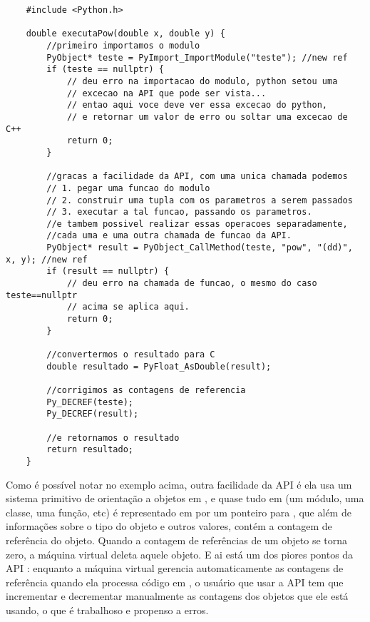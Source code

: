     \begin{lstlisting}
    #include <Python.h>
    
    double executaPow(double x, double y) {
        //primeiro importamos o modulo
        PyObject* teste = PyImport_ImportModule("teste"); //new ref
        if (teste == nullptr) {
            // deu erro na importacao do modulo, python setou uma 
            // excecao na API que pode ser vista...
            // entao aqui voce deve ver essa excecao do python,
            // e retornar um valor de erro ou soltar uma excecao de C++
            return 0;
        }
        
        //gracas a facilidade da API, com uma unica chamada podemos
        // 1. pegar uma funcao do modulo
        // 2. construir uma tupla com os parametros a serem passados
        // 3. executar a tal funcao, passando os parametros.
        //e tambem possivel realizar essas operacoes separadamente,
        //cada uma e uma outra chamada de funcao da API.
        PyObject* result = PyObject_CallMethod(teste, "pow", "(dd)", x, y); //new ref
        if (result == nullptr) {
            // deu erro na chamada de funcao, o mesmo do caso teste==nullptr
            // acima se aplica aqui.
            return 0;
        }
        
        //convertermos o resultado para C
        double resultado = PyFloat_AsDouble(result);
        
        //corrigimos as contagens de referencia
        Py_DECREF(teste);
        Py_DECREF(result);
        
        //e retornamos o resultado
        return resultado;
    }
    \end{lstlisting}
      
    \vspace{1em}
    
    Como é possível notar no exemplo acima, outra facilidade da API é ela usa um sistema 
    primitivo de orientação a objetos em \C{}, e quase tudo em  (um módulo, uma 
    classe, uma função, etc) é representado em \C{} por um ponteiro para , 
    que além de informações sobre o tipo do objeto e outros valores, contém a contagem de 
    referência do objeto. Quando a contagem de referências de um objeto se torna zero, a 
    máquina virtual deleta aquele objeto. E ai está um dos piores pontos da API : 
    enquanto a máquina virtual gerencia automaticamente as contagens de referência
    quando ela processa código em , o usuário que usar a API \C{} tem que incrementar e 
    decrementar manualmente as contagens dos objetos que ele está usando, o que é trabalhoso e 
    propenso a erros.
    
